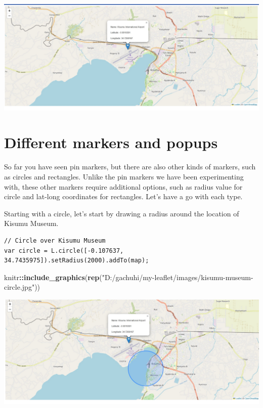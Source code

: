 \documentclass[
]{book}
\newenvironment{Shaded}{\begin{snugshade}}{\end{snugshade}}
\newcommand{\FunctionTok}[1]{\textcolor[rgb]{0.13,0.29,0.53}{\textbf{#1}}}
\newcommand{\NormalTok}[1]{#1}
\newcommand{\SpecialCharTok}[1]{\textcolor[rgb]{0.81,0.36,0.00}{\textbf{#1}}}
\newcommand{\StringTok}[1]{\textcolor[rgb]{0.31,0.60,0.02}{#1}}
\begin{document}
\includegraphics{../images/marker-html.jpg}

\hypertarget{different-markers-and-popups}{%
\section{Different markers and popups}\label{different-markers-and-popups}}

So far you have seen pin markers, but there are also other kinds of markers, such as circles and rectangles. Unlike the pin markers we have been experimenting with, these other markers require additional options, such as radius value for circle and lat-long coordinates for rectangles. Let's have a go with each type.

Starting with a circle, let's start by drawing a radius around the location of Kisumu Museum.

\begin{verbatim}
// Circle over Kisumu Museum
var circle = L.circle([-0.107637, 34.7435975]).setRadius(2000).addTo(map);
\end{verbatim}

\begin{Shaded}
\begin{Highlighting}[]
\NormalTok{knitr}\SpecialCharTok{::}\FunctionTok{include\_graphics}\NormalTok{(}\FunctionTok{rep}\NormalTok{(}\StringTok{"D:/gachuhi/my{-}leaflet/images/kisumu{-}museum{-}circle.jpg"}\NormalTok{))}
\end{Highlighting}
\end{Shaded}

\includegraphics{../images/kisumu-museum-circle.jpg}
\end{document}
